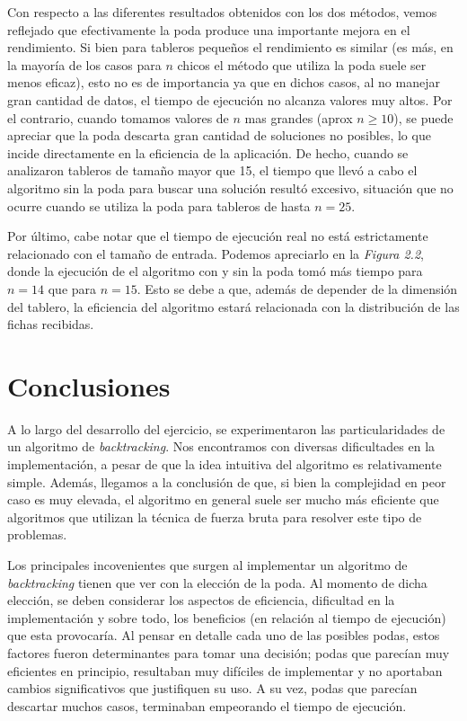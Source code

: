 \documentclass[a4paper,10pt] {article}
\begin{document}
Con respecto a las diferentes resultados obtenidos con los dos m\'etodos, vemos reflejado que efectivamente la poda produce una importante mejora en el rendimiento. Si bien para tableros peque\~{n}os el rendimiento es similar (es m\'as, en la mayor\'ia de los casos para $n$ chicos el m\'etodo que utiliza la poda suele ser menos eficaz), esto no es de importancia ya que en dichos casos, al no manejar gran cantidad de datos, el tiempo de ejecuci\'on no alcanza valores muy altos. Por el contrario, cuando tomamos valores de $n$ mas grandes (aprox $n\geq10$), se puede apreciar que la poda descarta gran cantidad de soluciones no posibles, lo que incide directamente en la eficiencia de la aplicaci\'on. De hecho, cuando se analizaron tableros de tama\~{n}o mayor que 15, el tiempo que llev\'o a cabo el algoritmo sin la poda para buscar una soluci\'on result\'o excesivo, situaci\'on que no ocurre cuando se utiliza la poda para tableros de hasta $n=25$.

Por \'ultimo, cabe notar que el tiempo de ejecuci\'on real no est\'a estrictamente relacionado con el tama\~{n}o de entrada. Podemos apreciarlo en la \textit{Figura 2.2}, donde la ejecuci\'on de el algoritmo con y sin la poda tom\'o m\'as tiempo para $n=14$ que para $n=15$. Esto se debe a que, adem\'as de depender de la dimensi\'on del tablero, la eficiencia del algoritmo estar\'a relacionada con la distribuci\'on de las fichas recibidas.

\section*{Conclusiones}

A lo largo del desarrollo del ejercicio, se experimentaron las particularidades de un algoritmo de \textit{backtracking}. Nos encontramos con diversas dificultades en la implementaci\'on, a pesar de que la idea intuitiva del algoritmo es relativamente simple. Adem\'as, llegamos a la conclusi\'on de que, si bien la complejidad en peor caso es muy elevada, el algoritmo en general suele ser mucho m\'as eficiente que algoritmos que utilizan la t\'ecnica de fuerza bruta para resolver este tipo de problemas. 

Los principales incovenientes que surgen al implementar un algoritmo de \textit{backtracking} tienen que ver con la elecci\'on de la poda. Al momento de dicha elecci\'on, se deben considerar los aspectos de eficiencia, dificultad en la implementaci\'on y sobre todo, los beneficios (en relaci\'on al tiempo de ejecuci\'on) que esta provocar\'ia. Al pensar en detalle cada uno de las posibles podas, estos factores fueron determinantes para tomar una decisi\'on; podas que parec\'ian muy eficientes en principio, resultaban muy dif\'iciles de implementar y no aportaban cambios significativos que justifiquen su uso. A su vez, podas que parec\'ian descartar muchos casos, terminaban empeorando el tiempo de ejecuci\'on.
\end{document}
